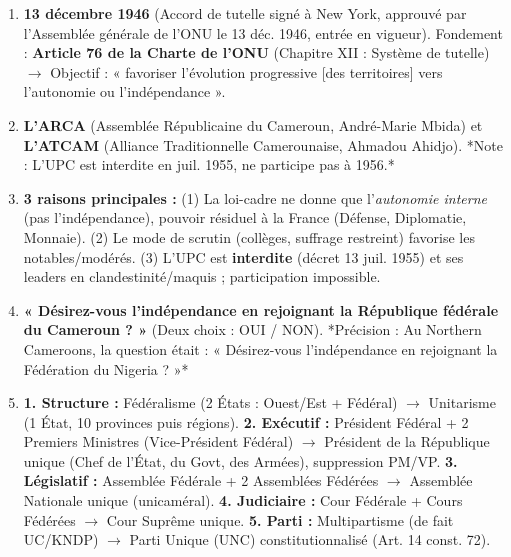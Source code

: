 \documentclass[11pt]{article}
\begin{document}
\begin{exoresolu}
\begin{enumerate}
    \item \textbf{13 décembre 1946} (Accord de tutelle signé à New York, approuvé par l'Assemblée générale de l'ONU le 13 déc. 1946, entrée en vigueur). Fondement : \textbf{Article 76 de la Charte de l'ONU} (Chapitre XII : Système de tutelle) $\rightarrow$ Objectif : « favoriser l'évolution progressive [des territoires] vers l'autonomie ou l'indépendance ».
    \item \textbf{L'ARCA} (Assemblée Républicaine du Cameroun, André-Marie Mbida) et \textbf{L'ATCAM} (Alliance Traditionnelle Camerounaise, Ahmadou Ahidjo). *Note : L'UPC est interdite en juil. 1955, ne participe pas à 1956.*
    \item \textbf{3 raisons principales :} (1) La loi-cadre ne donne que l'\emph{autonomie interne} (pas l'indépendance), pouvoir résiduel à la France (Défense, Diplomatie, Monnaie). (2) Le mode de scrutin (collèges, suffrage restreint) favorise les notables/modérés. (3) L'UPC est \textbf{interdite} (décret 13 juil. 1955) et ses leaders en clandestinité/maquis ; participation impossible.
    \item \textbf{« Désirez-vous l'indépendance en rejoignant la République fédérale du Cameroun ? »} (Deux choix : OUI / NON). *Précision : Au Northern Cameroons, la question était : « Désirez-vous l'indépendance en rejoignant la Fédération du Nigeria ? »*
    \item \textbf{1. Structure :} Fédéralisme (2 États : Ouest/Est + Fédéral) $\rightarrow$ Unitarisme (1 État, 10 provinces puis régions). \textbf{2. Exécutif :} Président Fédéral + 2 Premiers Ministres (Vice-Président Fédéral) $\rightarrow$ Président de la République unique (Chef de l'État, du Govt, des Armées), suppression PM/VP. \textbf{3. Législatif :} Assemblée Fédérale + 2 Assemblées Fédérées $\rightarrow$ Assemblée Nationale unique (unicaméral). \textbf{4. Judiciaire :} Cour Fédérale + Cours Fédérées $\rightarrow$ Cour Suprême unique. \textbf{5. Parti :} Multipartisme (de fait UC/KNDP) $\rightarrow$ Parti Unique (UNC) constitutionnalisé (Art. 14 const. 72).
\end{enumerate}
\end{exoresolu}
\end{document}
